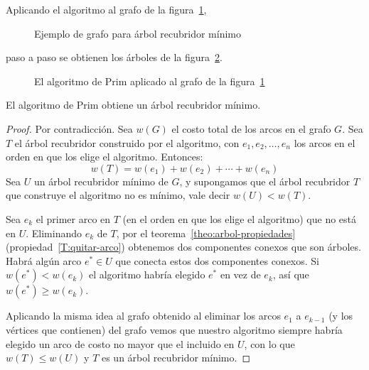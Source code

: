   Aplicando el algoritmo al grafo de la figura~\ref{fig:MST},
  \begin{figure}
    \centering
    \caption{Ejemplo de grafo para árbol recubridor mínimo}
    \label{fig:MST}
  \end{figure}
  paso a paso se obtienen los árboles de la figura~\ref{fig:Prim}.
  \begin{figure}
    \centering
    \hspace{2em}%

    \hspace{2em}%

    \caption{El algoritmo de Prim
	     aplicado al grafo de la figura~\ref{fig:MST}}
    \label{fig:Prim}
  \end{figure}

  \begin{theorem}
    El algoritmo de Prim obtiene un árbol recubridor mínimo.
  \end{theorem}
  \begin{proof}
    Por contradicción.%
    Sea \(w(G)\)  el costo total de los arcos en el grafo \(G\).
    Sea \(T\) el árbol recubridor construido por el algoritmo,
    con \(e_1, e_2, \dots, e_n\) los arcos
    en el orden en que los elige el algoritmo.
    Entonces:
    \begin{equation*}
      w(T) = w(e_1) + w(e_2) + \dotsb + w(e_n)
    \end{equation*}
    Sea \(U\) un árbol recubridor mínimo de \(G\),
    y supongamos que el árbol recubridor \(T\)
    que construye el algoritmo
    no es mínimo,
    vale decir \(w(U) < w(T)\).

    Sea \(e_k\) el primer arco en \(T\)
    (en el orden en que los elige el algoritmo)
    que no está en \(U\).
    Eliminando \(e_k\) de \(T\),
    por el teorema~\ref{theo:arbol-propiedades}
    (propiedad~\ref{T:quitar-arco})
    obtenemos dos componentes conexos que son árboles.
    Habrá algún arco \(e^{*} \in U\)
    que conecta estos dos componentes conexos.
    Si \(w(e^{*}) < w(e_k)\)
    el algoritmo habría elegido \(e^{*}\) en vez de \(e_k\),
    así que \(w(e^{*}) \ge w(e_k)\).

    Aplicando la misma idea al grafo obtenido
    al eliminar los arcos \(e_1\) a \(e_{k - 1}\)
    (y los vértices que contienen)
    del grafo
    vemos que nuestro algoritmo siempre habría elegido un arco
    de costo no mayor
    que el incluido en \(U\),
    con lo que \(w(T) \le w(U)\)
    y \(T\) es un árbol recubridor mínimo.
  \end{proof}

